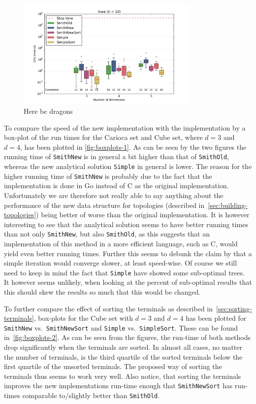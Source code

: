 \begin{figure}[htbp]
  \centering
  \includegraphics[width=0.8\textwidth]{gfx/boxplots/plot_nvst_boxplot_n10_Iowa_1}
  \caption[Here be dragons]{Here be dragons}
\end{figure}

To compare the speed of the new implementation with the implementation by
\textcite{smith1992} a box-plot of the run times for the Carioca set and Cube
set, where $d = 3$ and $d = 4$, has been plotted in \cref{fig:boxplots-1}. As
can be seen by the two figures the running time of \texttt{SmithNew} is in
general a bit higher than that of \texttt{SmithOld}, whereas the new analytical
solution \texttt{Simple} in general is lower. The reason for the higher running
time of \texttt{SmithNew} is probably due to the fact that the implementation is
done in Go instead of C as the original implementation. Unfortunately we are
therefore not really able to say anything about the performance of the new data
structure for topologies (described in~\cref{sec:building-topologies}) being
better of worse than the original implementation. It is however interesting to
see that the analytical solution seems to have better running times than not
only \texttt{SmithNew}, but also \texttt{SmithOld}, as this suggests that an
implementation of this method in a more efficient language, such as C, would
yield even better running times. Further this seems to debunk the claim by
\textcite{smith1992} that a simple iteration would converge slower, at least
speed-wise. Of course we still need to keep in mind the fact that
\texttt{Simple} have showed some sub-optimal trees. It however seems unlikely,
when looking at the percent of sub-optimal results that this should skew the
results so much that this would be changed.

To further compare the effect of sorting the terminals as described
in~\cref{sec:sorting-terminals}, box-plots for the Cube set with $d = 3$ and $d
= 4$ has been plotted for \texttt{SmithNew} vs.\ \texttt{SmithNewSort} and
\texttt{Simple} vs.\ \texttt{SimpleSort}. These can be found
in~\cref{fig:boxplots-2}. As can be seen from the figures, the run-time of both
methods drop significantly when the terminals are sorted. In almost all cases,
no matter the number of terminals, is the third quartile of the sorted terminals
below the first quartile of the unsorted terminals. The proposed way of sorting
the terminals thus seems to work very well. Also notice, that sorting the
terminals improves the new implementations run-time enough that
\texttt{SmithNewSort} has run-times comparable to/slightly better than
\texttt{SmithOld}.

